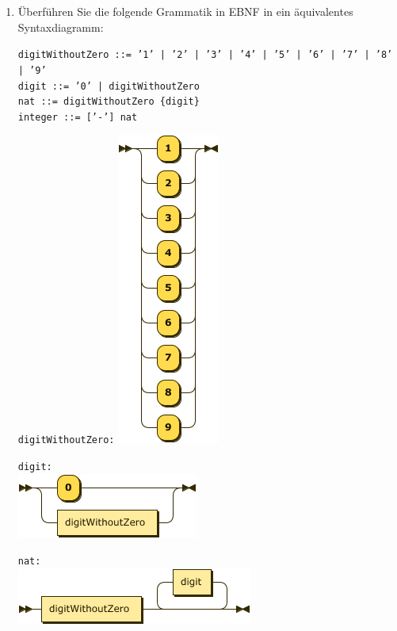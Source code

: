 \documentclass[]{article}
\begin{document}
\begin{enumerate}
	\item Überführen Sie die folgende Grammatik in EBNF in ein äquivalentes Syntaxdiagramm:
	
	\texttt{digitWithoutZero ::= '1' | '2' | '3' | '4' | '5' | '6' | '7' | '8' | '9'\\[1ex]
	digit ::= '0' | digitWithoutZero	\\[1ex]
	nat ::= digitWithoutZero \{digit\}\\[1ex]
	integer ::= ['-'] nat}
	
	\vspace{3ex}
	
	\begin{minipage}[t]{0.2\textwidth}
		\texttt{digitWithoutZero:}
		\includegraphics[scale=0.8]{figures/syntax-digitWithoutZero.png}
	\end{minipage}\hspace{1cm}
	\begin{minipage}[t]{0.3\textwidth}
		\texttt{digit:}\\
		\includegraphics[scale=0.8]{figures/syntax-digit.png}
		
		\vspace{1cm}
		
		\texttt{nat:}\\
		\includegraphics[scale=0.8]{figures/syntax-nat.png}
		

\end{minipage}
\end{enumerate}
\end{document}

